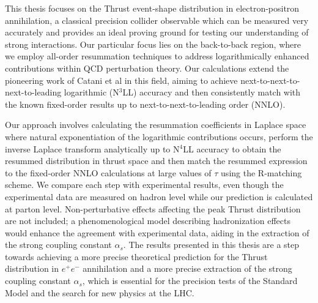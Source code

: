 \documentclass[10pt,english,twoside]{book}
\begin{document}
\frontispiece

\beforepreface %

This thesis focuses on the Thrust event-shape distribution in electron-positron 
annihilation, a classical precision collider observable which can be measured
very accurately and provides an ideal proving ground for testing our understanding of strong interactions.
Our particular focus lies on the back-to-back region, where we employ all-order resummation techniques to address logarithmically enhanced 
contributions within QCD perturbation theory. Our calculations extend the pioneering work of Catani et al \cite{CATANI19933}
in this field, aiming to achieve next-to-next-to-next-to-leading logarithmic (N$^3$LL) accuracy 
and then consistently match with the known fixed-order results up to next-to-next-to-leading order (NNLO).

Our approach involves calculating the resummation coefficients in Laplace space where natural exponentiation of the logarithmic contributions occurs,
perform the inverse Laplace transform analytically up to N$^4$LL accuracy to obtain the resummed distribution in thrust space and then
match the resummed expression to the fixed-order NNLO calculations at large values of $\tau$ using the R-matching scheme.
We compare each step with experimental results, even though the experimental data are measured on hadron level while our prediction is calculated at parton level.
Non-perturbative effects affecting the peak Thrust distribution are not included;
a phenomenological model describing hadronization effects would enhance the agreement with experimental data, aiding in the 
extraction of the strong coupling constant $\alpha_s$.
The results presented in this thesis are a step towards achieving a more precise theoretical prediction for the Thrust distribution in $e^+e^-$ annihilation and
a more precise extraction of the strong coupling constant $\alpha_s$, which is essential for the precision tests of the Standard Model and the search for new physics at the LHC. 




\tableofcontents
{}


\allowdisplaybreaks %















\appendix



\printbibliography
\end{document}
